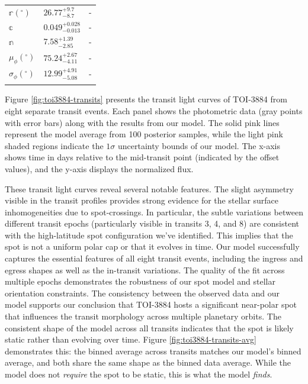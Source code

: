 \documentclass[twocolumn]{aastex631}
\newcommand{\sabinasays}[1]{{\color{purple}#1}}
\begin{document}
\begin{table}[]
\begin{tabular}{lll}
    $\mathbb{r} (^\circ)$                     & $26.77^{+9.7}_{-8.7}$                              &  -                   \\
    $\mathbb{c}$                              & $0.049^{+0.028}_{-0.013}$                          &  -                   \\
    $\mathbb{n}$                              & $7.58^{+1.39}_{-2.85}$                             &  -                   \\
    $\mu_\phi (^\circ)$                       & $75.24^{+2.67}_{-4.11}$                            &  -                   \\
    $\sigma_\phi (^\circ)$                  & $12.99^{+4.91}_{-5.08}$                              &  -                   \\ \hline
    \label{tab:ResultsT0i3884}
    \end{tabular}
\end{table}
%
Figure \ref{fig:toi3884-transits} presents the transit light curves of TOI-3884
from eight separate transit events. Each panel shows the photometric data (gray
points with error bars) along with the results from our model. The solid pink
lines represent the model average from 100 posterior samples, while the light
pink shaded regions indicate the $1\sigma$ uncertainty bounds of our model. The
x-axis shows time in days relative to the mid-transit point (indicated by the
offset values), and the y-axis displays the normalized flux.

These transit light curves reveal several notable features. The slight asymmetry
visible in the transit profiles provides strong evidence for the stellar surface
inhomogeneities due to spot-crossings. In particular, the subtle variations
between different transit epochs (particularly visible in transits 3, 4, and 8)
are consistent with the high-latitude spot configuration we've identified.
This implies that the spot is not a uniform polar cap or that
it evolves in time. Our model successfully captures the essential
features of all eight transit events, including the ingress and egress shapes as
well as the in-transit variations. The quality of the fit across multiple epochs
demonstrates the robustness of our spot model and stellar orientation
constraints. The consistency between the observed data and our model supports
our conclusion that TOI-3884 hosts a significant near-polar spot that influences
the transit morphology across multiple planetary orbits. \sabinasays{The consistent shape of the model across all transits indicates that the spot is likely static rather than evolving over time. Figure \ref{fig:toi3884-transits-avg} demonstrates this: the binned average across transits matches our model's binned average, and both share the same shape as the binned data average. While the model does not \textit{require} the spot to be static, this is what the model \textit{finds}}.
\end{document}
